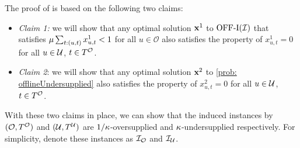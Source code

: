 {The proof of {} is based on the following two claims:
\begin{itemize}
    \item \emph{Claim 1:} we will show that {any} %
optimal solution $\mathbf{x}^{1}$ to $\mathrm{\mathrm{OFF}}\textrm{-}\mathrm{I}(\mathcal I)$ that satisfies $\mu \sum_{t: (u,t)} x^{1}_{u,t} <1$ for all $u \in \mathcal O$ also satisfies the property of $x^{1}_{u,t} = 0$ for all $u \in \mathcal U$, $t \in T^\mathcal O$.
    \item \emph{Claim 2}: we will show that {any} %
optimal solution $\mathbf{x}^{2}$ to \ref{prob: offlineUndersupplied} also satisfies the property of $x^{2}_{u,t} = 0$ for all $u \in \mathcal U$, $t \in T^\mathcal O$.
\end{itemize}

With these two claims in place, we can show that the induced instances by $(\mathcal O, T^\mathcal O)$ and $(\mathcal U, T^{\mathcal U})$ are $1/\kappa$-oversupplied and $\kappa$-undersupplied respectively. For simplicity, denote these instances as $\mathcal I_{\mathcal O}$ and $\mathcal I_{\mathcal U}$.

}
